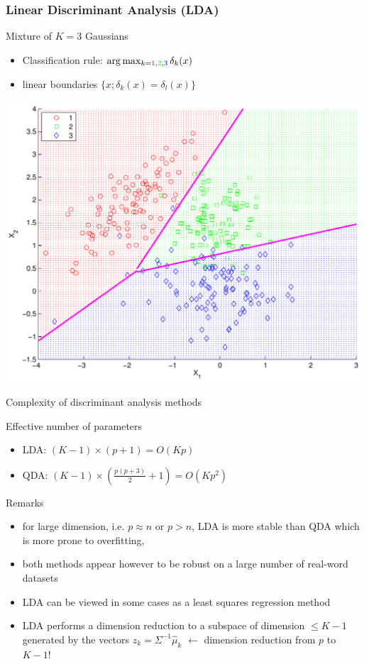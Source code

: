 \documentclass[compress, smaller, serif, 9pt]{beamer}
\newcommand{\structuretext}[1]{{\usebeamercolor[fg]{structure} #1}}
\begin{document}
\begin{frame}
  \frametitle{Linear Discriminant Analysis (LDA)}
\begin{block}{Mixture of $K=3$ Gaussians}
\begin{itemize}
   \item  Classification rule:  $\arg \max_{k=\textcolor{red}{1},\textcolor{green}{2},\textcolor{blue}{3}}
\delta_k(x)$
\item linear boundaries $\{ x ; \delta_k(x)=\delta_l(x) \} $
\end{itemize}
\end{block}
\vspace*{-5mm}

\begin{center}
  \includegraphics[width=.65\textwidth]{linear_analysis_bounds.pdf} \\
\end{center}

\end{frame}


\begin{frame}{Complexity of discriminant analysis methods}
\begin{block}{Effective number of parameters}
\begin{itemize}
   \item LDA: $(K-1) \times (p+1) = O(Kp)$
   \item QDA: $(K-1) \times \left( \frac{p(p+3)}{2} +1 \right) = O(Kp^2)$
\end{itemize}
\end{block}

\begin{block}{Remarks}
\begin{itemize}
   \item for large dimension, i.e. $p \approx n$  or $p>n$, LDA is more stable than QDA which is more prone to overfitting,
   \item both methods appear however to be  robust on a large number of real-word datasets
   \item LDA can be viewed in some cases as a least squares regression method
   \item LDA performs a dimension reduction to a subspace of dimension $\le K-1$ generated by
   the vectors $z_k=\Sigma^{-1} \widehat{\mu}_k$  $\leftarrow$ \structuretext{dimension reduction from $p$ to $K-1$}\quad !
\end{itemize}
\end{block}
\end{frame}
\end{document}
